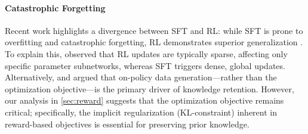 \documentclass{article}
\theoremstyle{plain}
\theoremstyle{definition}
\theoremstyle{remark}
\begin{document}


\paragraph{Catastrophic Forgetting}

Recent work highlights a divergence between SFT and RL: while SFT is prone to overfitting and catastrophic forgetting, RL demonstrates superior generalization \citep{chu2025sft,huan2025does}. To explain this, \citet{mukherjee2025reinforcement} observed that RL updates are typically sparse, affecting only specific parameter subnetworks, whereas SFT triggers dense, global updates. Alternatively, \citet{shenfeld2025rl} and \citet{chen2025retaining} argued that on-policy data generation—rather than the optimization objective—is the primary driver of knowledge retention. However, our analysis in \cref{sec:reward} suggests that the optimization objective remains critical; specifically, the implicit regularization (KL-constraint) inherent in reward-based objectives is essential for preserving prior knowledge.
\end{document}
